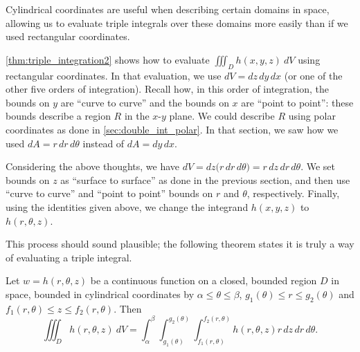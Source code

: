 Cylindrical coordinates are useful when describing certain domains in space, allowing us to evaluate triple integrals over these domains more easily than if we used rectangular coordinates.

\autoref{thm:triple_integration2} shows how to evaluate $\iiint_Dh(x,y,z)\ dV$ using rectangular coordinates. In that evaluation, we use $dV = dz\,dy\,dx$ (or one of the other five orders of integration). Recall how, in this order of integration, the bounds on $y$ are ``curve to curve'' and the bounds on $x$ are ``point to point'': these bounds describe a region $R$ in the $x$-$y$ plane. We could describe $R$ using polar coordinates as done in \autoref{sec:double_int_polar}. In that section, we saw how we used $dA = r\,dr\,d\theta$ instead of $dA = dy\,dx$. 

Considering the above thoughts, we have $dV = dz\bigl(r\,dr\,d\theta\bigr) = r\,dz\,dr\,d\theta$. We set bounds on $z$ as ``surface to surface'' as done in the previous section, and then use ``curve to curve'' and ``point to point'' bounds on $r$ and $\theta$, respectively. Finally, using the identities given above, we change the integrand $h(x,y,z)$ to $h(r,\theta,z)$.

This process should sound plausible; the following theorem states it is truly a way of evaluating a triple integral.

\begin{theorem}\label{thm:triple_int_cylindrical}
%
Let $w=h(r,\theta,z)$ be a continuous function on a closed, bounded region $D$ in space, bounded in cylindrical coordinates by $\alpha \leq \theta \leq \beta$, $g_1(\theta)\leq r \leq g_2(\theta)$ and $f_1(r,\theta) \leq z \leq f_2(r,\theta)$. Then  
\[
\iiint_D h(r,\theta,z)\ dV = \int_\alpha^\beta\int_{g_1(\theta)}^{g_2(\theta)}\int_{f_1(r,\theta)}^{f_2(r,\theta)}h(r,\theta,z) r\,dz\,dr\,d\theta.
\]
\end{theorem}


